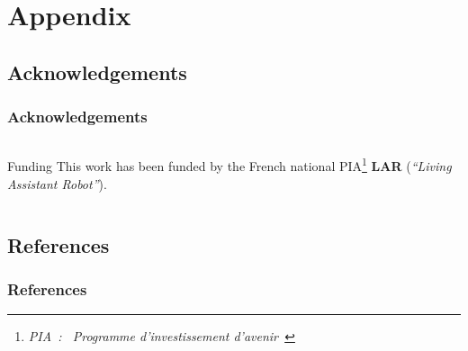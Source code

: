 \documentclass[10pt,c]{beamer}
\begin{document}

\appendix


\section{Appendix}

\subsection{Acknowledgements}

\begin{frame}
\frametitle{Acknowledgements}
\begin{columns}[c]
\begin{column}{8.25cm}
\begin{block}{Funding}
This work has been funded by the French national PIA\footnote{\textsl{PIA~:
\guillemotleft~Programme d'investissement d'avenir~\guillemotright}}
\textbf{LAR} (\textit{``Living Assistant Robot''}).
\end{block}
\end{column}
\end{columns}
\end{frame}

\subsection{References}

\begin{frame}
\frametitle{References}


\end{frame}


\end{document}
